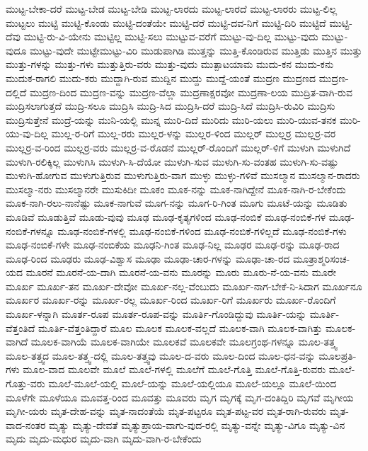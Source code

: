 {ಮುಟ್ಟ-ಬೇಕಾ-ದರೆ
ಮುಟ್ಟ-ಬೇಡ
ಮುಟ್ಟ-ಬೇಡಿ
ಮುಟ್ಟ-ಲಾರದು
ಮುಟ್ಟ-ಲಾರದೆ
ಮುಟ್ಟ-ಲಾರರು
ಮುಟ್ಟ-ಲಿಲ್ಲ
ಮುಟ್ಟಲು
ಮುಟ್ಟಿ
ಮುಟ್ಟಿ-ಕೊಂಡು
ಮುಟ್ಟಿ-ದಂತೆಯೇ
ಮುಟ್ಟಿ-ದರೆ
ಮುಟ್ಟಿ-ದವ-ನಿಗೆ
ಮುಟ್ಟಿ-ದಿರಿ
ಮುಟ್ಟಿದೆ
ಮುಟ್ಟಿ-ದೆವು
ಮುಟ್ಟಿ-ರು-ವಿ-ಯೇನು
ಮುಟ್ಟಿಲ್ಲ
ಮುಟ್ಟಿ-ಸಲು
ಮುಟ್ಟುವ-ವರೆಗೆ
ಮುಟ್ಟು-ವು-ದಿಲ್ಲ
ಮುಟ್ಟು-ವುದು
ಮುಟ್ಟು-ವುದೂ
ಮುಟ್ಟು-ವುದೇ
ಮುಟ್ಟೇಮುಟ್ಟು-ವಿರಿ
ಮುಡುಪಾಗಿಡಿ
ಮುತ್ತನ್ನು
ಮುತ್ತಿ-ಕೊಂಡಿರುವ
ಮುತ್ತಿಡು
ಮುತ್ತಿನ
ಮುತ್ತು
ಮುತ್ತು-ಗಳನ್ನು
ಮುತ್ತು-ಗಳು
ಮುತ್ತುತ್ತಿರು-ವರು
ಮುತ್ತು-ವುದು
ಮುತ್ಪಾಟಯಾಮ
ಮುದು-ಕನ
ಮುದು-ಕನು
ಮುದುಕ-ರಾಗಲಿ
ಮುದು-ಕರು
ಮುದ್ದಾಗಿ-ರುವ
ಮುದ್ದಿನ
ಮುದ್ದು
ಮುದ್ದೆ-ಯಂತೆ
ಮುದ್ರಣ
ಮುದ್ರಣದ
ಮುದ್ರಣ-ದಲ್ಲಿದೆ
ಮುದ್ರಣ-ದಿಂದ
ಮುದ್ರಣ-ವನ್ನು
ಮುದ್ರಣ-ವೆಲ್ಲಾ
ಮುದ್ರಣಾಕ್ಷರವೋ
ಮುದ್ರಣಾ-ಲಯ
ಮುದ್ರಿತ-ವಾಗಿ-ರುವ
ಮುದ್ರಿಸಲಾಗುತ್ತದೆ
ಮುದ್ರಿ-ಸಲೂ
ಮುದ್ರಿಸಿ
ಮುದ್ರಿ-ಸಿದ
ಮುದ್ರಿಸಿ-ದರೆ
ಮುದ್ರಿ-ಸಿದೆ
ಮುದ್ರಿಸಿ-ರುವಿರಿ
ಮುದ್ರಿಸು
ಮುದ್ರಿಸುತ್ತೇನೆ
ಮುದ್ರೆ-ಯನ್ನು
ಮುನಿ-ಯಲ್ಲಿ
ಮುನ್ನ
ಮುರಿ-ದಿದೆ
ಮುರಿದು
ಮುರಿ-ಯಲು
ಮುರಿ-ಯುವ-ತನಕ
ಮುರಿ-ಯು-ವು-ದಿಲ್ಲ
ಮುಲ್ಲ-ರ-ರಿಗೆ
ಮುಲ್ಲ-ರರು
ಮುಲ್ಲರ-ಳನ್ನು
ಮುಲ್ಲರ-ಳಿಂದ
ಮುಲ್ಲರ್
ಮುಲ್ಲರ್ರ
ಮುಲ್ಲರ್ರ-ವರ
ಮುಲ್ಲರ್ರ-ವ-ರಿಂದ
ಮುಲ್ಲರ್ರ-ವರು
ಮುಲ್ಲರ್ರ-ವ-ರೊಡನೆ
ಮುಲ್ಲರ್-ರೊಂದಿಗೆ
ಮುಲ್ಲರ್-ಳಿಗೆ
ಮುಳುಗಿ
ಮುಳುಗಿದೆ
ಮುಳುಗಿ-ರಲಿಕ್ಕಿಲ್ಲ
ಮುಳುಗಿಸಿ
ಮುಳುಗಿ-ಸಿ-ದೆಯೋ
ಮುಳುಗಿ-ಸುವ
ಮುಳುಗಿ-ಸು-ವಂತಹ
ಮುಳುಗಿ-ಸು-ವಷ್ಟು
ಮುಳುಗಿ-ಹೋಗುವ
ಮುಳುಗುತ್ತಿರುವ
ಮುಳುಗುತ್ತಿರು-ವಾಗ
ಮುಳ್ಳು
ಮುಳ್ಳು-ಗಳಿವೆ
ಮುಸಲ್ಮಾನ
ಮುಸಲ್ಮಾನ-ರಾದರು
ಮುಸಲ್ಮಾ-ನರು
ಮುಸಲ್ಮಾನರೇ
ಮುಸುಕಿದೀ
ಮೂಕಂ
ಮೂಕ-ನನ್ನು
ಮೂಕ-ನಾಗಿದ್ದೇನೆ
ಮೂಕ-ನಾಗಿ-ರ-ಬೇಕೆಂದು
ಮೂಕ-ನಾಗಿ-ರಲು-ನಾನೆಷ್ಟು
ಮೂಕ-ನಾಗುವೆ
ಮೂಗ-ನನ್ನು
ಮೂಗ-ರಿ-ಗಿಂತ
ಮೂಗು
ಮೂಟೆ-ಯನ್ನು
ಮೂಡಿತು
ಮೂಡಿವೆ
ಮೂಡುತ್ತಿವೆ
ಮೂಡು-ವುವು
ಮೂಢ
ಮೂಢ-ಕೃತ್ಯಗಳಿಂದ
ಮೂಢ-ನಂಬಿಕೆ
ಮೂಢ-ನಂಬಿಕೆ-ಗಳ
ಮೂಢ-ನಂಬಿಕೆ-ಗಳನ್ನೂ
ಮೂಢ-ನಂಬಿಕೆ-ಗಳಲ್ಲಿ
ಮೂಢ-ನಂಬಿಕೆ-ಗಳಿಂದ
ಮೂಢ-ನಂಬಿಕೆ-ಗಳಿಲ್ಲದೆ
ಮೂಢ-ನಂಬಿಕೆ-ಗಳು
ಮೂಢ-ನಂಬಿಕೆ-ಗಳೇ
ಮೂಢ-ನಂಬಿಕೆಯ
ಮೂಢನಿ-ಗಿಂತ
ಮೂಢ-ನಿಲ್ಲ
ಮೂಢರ
ಮೂಢ-ರನ್ನು
ಮೂಢ-ರಾದ
ಮೂಢ-ರಿಂದ
ಮೂಢರು
ಮೂಢ-ವಿಶ್ವಾಸ
ಮೂಢಾ
ಮೂಢಾ-ಚಾರ-ಗಳನ್ನು
ಮೂಢಾ-ಚಾ-ರದ
ಮೂತ್ರಾಶ್ಮರಿಸಂಚ-ಯದ
ಮೂರನೆ
ಮೂರನೆ-ಯ-ದಾಗಿ
ಮೂರನೆ-ಯ-ವನು
ಮೂರನ್ನು
ಮೂರು
ಮೂರು-ನೆ-ಯ-ವನು
ಮೂರೇ
ಮೂರ್ಖ
ಮೂರ್ಖ-ತನ
ಮೂರ್ಖ-ದೇವೋ
ಮೂರ್ಖ-ನಲ್ಲ-ವೆಂಬುದು
ಮೂರ್ಖ-ನಾಗ-ಬೇಕೆ-ನಿ-ಸಿದಾಗ
ಮೂರ್ಖನೂ
ಮೂರ್ಖರ
ಮೂರ್ಖ-ರನ್ನು
ಮೂರ್ಖ-ರಲ್ಲ
ಮೂರ್ಖ-ರಿಂದ
ಮೂರ್ಖ-ರಿಗೆ
ಮೂರ್ಖರು
ಮೂರ್ಖ-ರೊಂದಿಗೆ
ಮೂರ್ಖ-ಳನ್ನಾಗಿ
ಮೂರ್ತ-ರೂಪ
ಮೂರ್ತ-ರೂಪ-ವನ್ನು
ಮೂರ್ತಿ-ಗೊಂಡಿದ್ದುವು
ಮೂರ್ತಿ-ಯನ್ನು
ಮೂರ್ತಿ-ವೆತ್ತಂತಿದೆ
ಮೂರ್ತಿ-ವೆತ್ತಂತಿದ್ದಾರೆ
ಮೂಲ
ಮೂಲಕ
ಮೂಲಕ-ವಲ್ಲದೆ
ಮೂಲಕ-ವಾಗಿ
ಮೂಲಕ-ವಾಗಿತ್ತು
ಮೂಲಕ-ವಾಗಿದೆ
ಮೂಲಕ-ವಾಗಿಯೆ
ಮೂಲಕ-ವಾಗಿಯೇ
ಮೂಲಕವೆ
ಮೂಲಕವೇ
ಮೂಲಗ್ರಂಥ-ಗಳನ್ನೂ
ಮೂಲ-ತತ್ತ್ವ
ಮೂಲ-ತತ್ತ್ವದ
ಮೂಲ-ತತ್ತ್ವ-ದಲ್ಲಿ
ಮೂಲ-ತತ್ತ್ವವು
ಮೂಲ-ದ-ವರು
ಮೂಲ-ದಿಂದ
ಮೂಲ-ಧನ-ವನ್ನು
ಮೂಲಪ್ರತಿ-ಗಳು
ಮೂಲ-ವಾದ
ಮೂಲವೇ
ಮೂಲೆ
ಮೂಲೆ-ಗಳಲ್ಲಿ
ಮೂಲೆಗೆ
ಮೂಲೆ-ಗೊತ್ತಿ
ಮೂಲೆ-ಗೊತ್ತಿ-ರುವರು
ಮೂಲೆ-ಗೊತ್ತು-ವರು
ಮೂಲೆ-ಮೂಲೆ-ಯಲ್ಲಿ
ಮೂಲೆ-ಯನ್ನು
ಮೂಲೆ-ಯಲ್ಲಿಯೂ
ಮೂಲೆ-ಯಲ್ಲೂ
ಮೂಲೆ-ಯಿಂದ
ಮೂಳೆಗೇ
ಮೂಳೆಯೂ
ಮೂವತ್ತ-ರಿಂದ
ಮೂವತ್ತು
ಮೂವರು
ಮೃಗ
ಮೃಗಕ್ಕೆ
ಮೃಗ-ದಂತಿದ್ದಿರಿ
ಮೃಗವೆ
ಮೃಗೀಯ
ಮೃಗೀ-ಯರು
ಮೃತ-ದೇಹ-ವನ್ನು
ಮೃತ-ನಾದಂತೆಯೆ
ಮೃತ-ಪಟ್ಟರೂ
ಮೃತ-ಪಟ್ಟ-ವರ
ಮೃತ-ರಾಗಿ-ರುವರು
ಮೃತ-ವಾದ-ನಂತರ
ಮೃತ್ಯು
ಮೃತ್ಯು-ದೇವತೆ
ಮೃತ್ಯುಪ್ರಾಯ-ವಾಗು-ವುದ-ರಲ್ಲಿ
ಮೃತ್ಯು-ವನ್ನೇ
ಮೃತ್ಯು-ವಿಗೂ
ಮೃತ್ಯು-ವಿನ
ಮೃದು
ಮೃದು-ಮಧುರ
ಮೃದು-ವಾಗಿ
ಮೃದು-ವಾಗಿ-ರ-ಬೇಕೆಂದು
}
